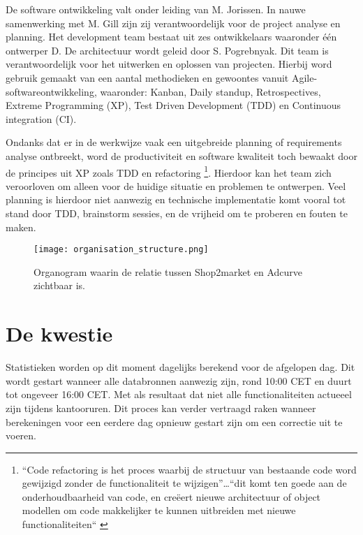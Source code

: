 De software ontwikkeling valt onder leiding van M. Jorissen. In nauwe samenwerking met M. Gill zijn zij verantwoordelijk voor de project analyse en planning. Het development team bestaat uit zes ontwikkelaars waaronder één ontwerper D.  De architectuur wordt geleid door S. Pogrebnyak. Dit team is verantwoordelijk voor het uitwerken en oplossen van projecten. Hierbij word gebruik gemaakt van een aantal methodieken en gewoontes vanuit Agile-softwareontwikkeling, waaronder: Kanban, Daily standup, Retrospectives, Extreme Programming (XP), Test Driven Development (TDD) en Continuous integration (CI).

Ondanks dat er in de werkwijze vaak een uitgebreide planning of requirements analyse ontbreekt, word de productiviteit en software kwaliteit toch bewaakt door de principes uit XP zoals TDD en refactoring \footnote{“Code refactoring is het proces waarbij de structuur van bestaande code word gewijzigd zonder de functionaliteit te wijzigen”…“dit komt ten goede aan de onderhoudbaarheid van code, en creëert nieuwe architectuur of object modellen om code makkelijker te kunnen uitbreiden met nieuwe functionaliteiten“ \parencite{refactoring}}. Hierdoor kan het team zich veroorloven om alleen voor de huidige situatie en problemen te ontwerpen. Veel planning is hierdoor niet aanwezig en technische implementatie komt vooral tot stand door TDD, brainstorm sessies, en de vrijheid om te proberen en fouten te maken.

\begin{figure}[h]
    \texttt{[image: organisation\_structure.png]}
    \caption{Organogram waarin de relatie tussen Shop2market en Adcurve zichtbaar is.}
    \label{fig:orgchart}
\end{figure}

\section{De kwestie} %

Statistieken worden op dit moment dagelijks berekend voor de afgelopen dag. Dit wordt gestart wanneer alle databronnen aanwezig zijn, rond 10:00 CET en duurt tot ongeveer 16:00 CET. Met als resultaat dat niet alle functionaliteiten actueeel zijn tijdens kantooruren. Dit proces kan verder vertraagd raken wanneer berekeningen voor een eerdere dag opnieuw gestart zijn om een correctie uit te voeren.


